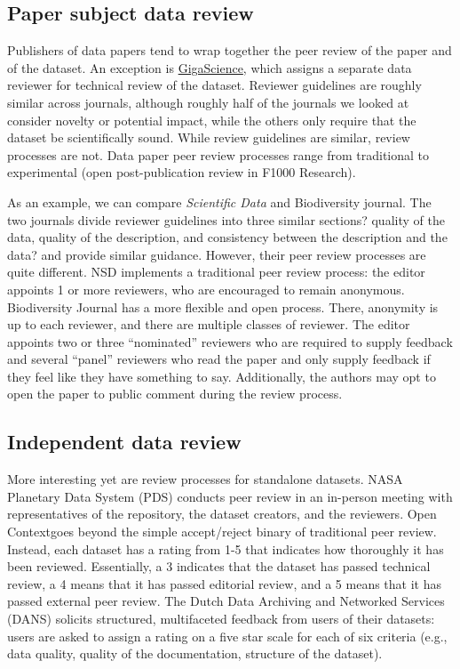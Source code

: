 \documentclass[10pt,a4paper,twocolumn]{article}
\begin{document}
\subsection*{Paper subject data review}
Publishers of data papers tend to wrap together the peer review of the paper and of the dataset. 
An exception is \href{http://www.gigasciencejournal.com/}{GigaScience}, which assigns a separate data reviewer for technical review of the dataset. 
Reviewer guidelines are roughly similar across journals, although roughly half of the journals we looked at consider novelty or potential impact, while the others only require that the dataset be scientifically sound.
While review guidelines are similar, review processes are not. 
Data paper peer review processes range from traditional to experimental (open post-publication review in F1000 Research).

As an example, we can compare \emph{Scientific Data} and Biodiversity journal.
The two journals divide reviewer guidelines into three similar sections? quality of the data, quality of the description, and consistency between the description and the data? and provide similar guidance.
However, their peer review processes are quite different.
NSD implements a traditional peer review process: the editor appoints 1 or more reviewers, who are encouraged to remain anonymous.
Biodiversity Journal has a more flexible and open process.
There, anonymity is up to each reviewer, and there are multiple classes of reviewer.
The editor appoints two or three ``nominated'' reviewers who are required to supply feedback and several ``panel'' reviewers who read the paper and only supply feedback if they feel like they have something to say.
Additionally, the authors may opt to open the paper to public comment during the review process.


\subsection*{Independent data review}
More interesting yet are review processes for standalone datasets. 
NASA Planetary Data System (PDS)\cite{nasa_pds} conducts peer review in an in-person meeting with representatives of the repository, the dataset creators, and the reviewers. 
Open Context\href{http://opencontext.org/} goes beyond the simple accept/reject binary of traditional peer review.\cite{kansa_we_2013} 
Instead, each dataset has a rating from 1-5 that indicates how thoroughly it has been reviewed. 
Essentially, a 3 indicates that the dataset has passed technical review, a 4 means that it has passed editorial review, and a 5 means that it has passed external peer review. 
The Dutch Data Archiving and Networked Services (DANS) solicits structured, multifaceted feedback from users of their datasets: users are asked to assign a rating on a five star scale for each of six criteria (e.g., data quality, quality of the documentation, structure of the dataset)\cite{grootveld_data_2011,grootveld_peer_2012}. 
\end{document}
